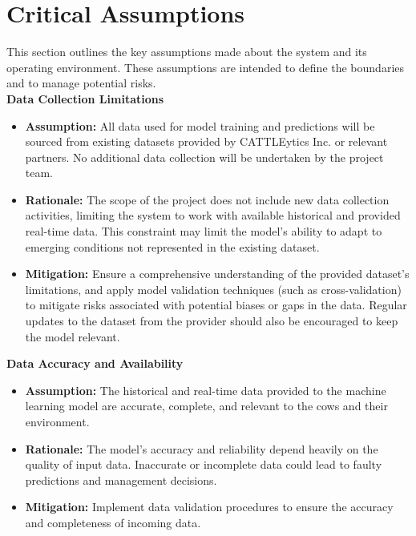 \documentclass{article}
\begin{document}
\section{Critical Assumptions}

This section outlines the key assumptions made about the system and its 
operating environment. These assumptions are intended to define the boundaries 
and to manage potential risks.\\

\textbf{Data Collection Limitations} 
\begin{itemize} 
    \item \textbf{Assumption:} All data used for model training and predictions 
    will be sourced from existing datasets provided by CATTLEytics Inc. or 
    relevant partners. No additional data collection will be undertaken by the 
    project team. 
    \item \textbf{Rationale:} The scope of the project does not include new data 
    collection activities, limiting the system to work with available historical 
    and provided real-time data. This constraint may limit the model's ability to 
    adapt to emerging conditions not represented in the existing dataset. 
    \item \textbf{Mitigation:} Ensure a comprehensive understanding of the provided 
    dataset's limitations, and apply model validation techniques 
    (such as cross-validation) to mitigate risks associated with potential 
    biases or gaps in the data. Regular updates to the dataset from the provider 
    should also be encouraged to keep the model relevant. 
\end{itemize}

\textbf{Data Accuracy and Availability}
\begin{itemize}
    \item \textbf{Assumption:} The historical and real-time data provided to the 
    machine learning model are accurate, complete, and relevant to the cows and 
    their environment.
    \item \textbf{Rationale:} The model's accuracy and reliability depend heavily 
    on the quality of input data. Inaccurate or incomplete data could lead to 
    faulty predictions and management decisions.
    \item \textbf{Mitigation:} Implement data validation procedures to ensure 
    the accuracy and completeness of incoming data.
\end{itemize}
\end{document}
